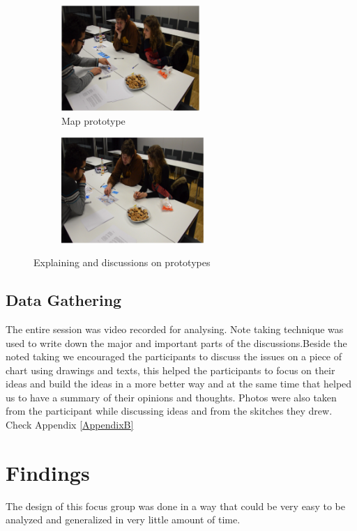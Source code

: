 \begin{figure}[H]
    \centering
    \begin{subfigure}[H]{0.45\textwidth}
        \centering
        \includegraphics[width=\textwidth,height=4cm]{Figures/4/show_map}
        \caption{Map prototype}
        \label{fig:tellmap}
    \end{subfigure}
    \hfill
    \begin{subfigure}[H]{0.45\textwidth}
        \centering
        \includegraphics[width=\textwidth,height=4cm]{Figures/4/tell_map}
        \caption{}
        \label{fig:show_map}
    \end{subfigure}
    \caption{Explaining and discussions on prototypes }
    \label{fig:map_chess_prototypes}
\end{figure}



\subsection{Data Gathering}
The entire session was video recorded for analysing. Note taking technique was used to write down the major and important parts of the discussions.Beside the noted taking we encouraged the participants to discuss the issues on a piece of chart using drawings and texts, this helped the participants to focus on their ideas and build the ideas in a more better way and at the same time that helped us to have a summary of their opinions and thoughts. Photos were also taken from the participant while discussing ideas and from the skitches they drew. Check Appendix \ref{AppendixB}


\section{Findings}
The design of this focus group was done in a way that could be very easy to be analyzed and generalized in very little amount of time. 

